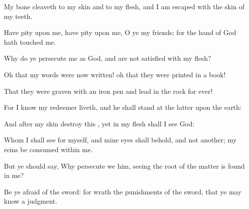 {My
bone
cleaveth to my
skin and to my
flesh, and I am
escaped with the
skin of my
teeth.

Have
pity upon me, have
pity upon me, O ye my
friends; for the
hand of
God hath
touched me.

Why do ye
persecute me as
God, and are not
satisfied with my
flesh?


\par }{\PP {}Oh
that my
words were
now
written! oh
that they were
printed in a
book!

That they were
graven with an
iron
pen and
lead in the
rock for
ever!

For I
know
{} my
redeemer
liveth, and
{} he shall
stand at the
latter
{} upon the
earth:

And
{}
after my
skin
{}
destroy this
{}, yet in my
flesh shall I
see
God:

Whom I shall
see for myself, and mine
eyes shall
behold, and not
another;
{} my
reins be
consumed
within me.

But ye should
say, Why
persecute we him, seeing the
root of the
matter is
found in me?

Be ye
afraid of the
sword: for
wrath
{} the
punishments
of the
sword, that ye may
know
{} a
judgment.




\par }
